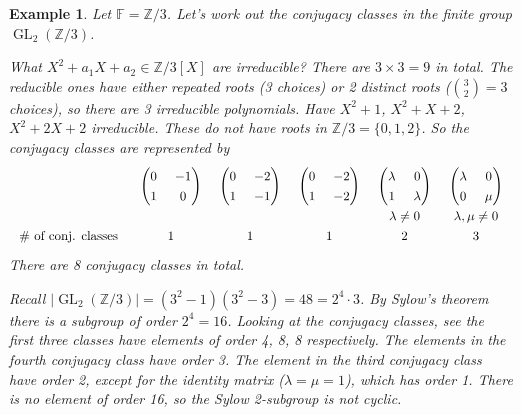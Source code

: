 \documentclass{article}
\theoremstyle{plain}\theoremheaderfont{\normalfont\itshape}\theorembodyfont{\rmfamily}\theoremseparator{.}\newtheorem*{rem}{Remark}\newtheorem*{ex}{Example}\newtheorem*{proof}{Proof}\newtheorem*{altp}{Alternative proof}\newtheorem*{nonex}{Non-Example}
\theoremstyle{plain}\theoremheaderfont{\normalfont\bfseries}\theorembodyfont{\rmfamily}\theoremseparator{.}\newtheorem{thm}{Theorem}[section]\newtheorem{lem}[thm]{Lemma}\newtheorem{prop}[thm]{Proposition}\newtheorem*{cor}{Corollary}\newtheorem{defn}[thm]{Definition}\newtheorem{clm}[thm]{Claim}\newtheorem{clminproof}{Claim}\newtheorem*{notn}{Notation}\newtheorem*{exer}{Exercise}\newtheorem*{lemnn}{Lemma}
\theoremstyle{break}\theoremheaderfont{\normalfont\itshape}\theorembodyfont{\rmfamily}\theoremseparator{.\medskip}\newtheorem*{proofskip}{Proof}\newtheorem*{exs}{Examples}\newtheorem*{rems}{Remarks}\newtheorem*{obs}{Observations}
\theoremstyle{break}\theoremheaderfont{\normalfont\bfseries}\theorembodyfont{\rmfamily}\theoremseparator{.\medskip}\newtheorem{lemskip}[thm]{Lemma}\newtheorem{defnskip}[thm]{Definition}\newtheorem{propskip}[thm]{Proposition}\newtheorem{thmskip}[thm]{Theorem}
\numberwithin{equation}{section}
\newcommand{\abs}[1]{\left|#1\right|}
\DeclareMathOperator{\GL}{GL}
\newcommand{\ZZ}{\mathbb{Z}}
\newcommand{\FF}{\mathbb{F}}
\begin{document}
    \begin{ex}
        Let \(\FF=\ZZ/3\). Let's work out the conjugacy classes in the finite group \(\GL_2(\ZZ/3)\).

        What \(X^2+a_1X+a_2\in\ZZ/3[X]\) are irreducible? There are \(3\times 3=9\) in total. The reducible ones have either repeated roots (3 choices) or 2 distinct roots (\(\binom{3}{2}=3\) choices), so there are 3 irreducible polynomials. Have \(X^2+1\), \(X^2+X+2\), \(X^2+2X+2\) irreducible. These do not have roots in \(\ZZ/3=\{0,1,2\}\). So the conjugacy classes are represented by
        \[\def\arraystretch{1.3}\arraycolsep=7pt
        \begin{array}{cccccc}
             ~ & \begin{pmatrix}
                0 & -1 \\ 1 & 0
            \end{pmatrix} & \begin{pmatrix}
                0 & -2 \\ 1 & -1
            \end{pmatrix} & \begin{pmatrix}
                0 & -2 \\ 1 & -2
            \end{pmatrix} & \begin{pmatrix}
                \lambda & 0 \\ 1 & \lambda
            \end{pmatrix} & \begin{pmatrix}
                \lambda & 0 \\ 0 & \mu
            \end{pmatrix} \\
            ~ & ~ & ~ & ~ & \lambda\ne 0 & \lambda,\mu\ne 0 \\
            \#\text{ of conj. classes } & 1 & 1 & 1 & 2 & 3
        \end{array}\]
        There are 8 conjugacy classes in total.

        Recall \(\abs{\GL_2(\ZZ/3)}=(3^2-1)(3^2-3)=48=2^4\cdot 3\). By Sylow's theorem there is a subgroup of order \(2^4=16\).  Looking at the conjugacy classes, see the first three classes have elements of order 4, 8, 8 respectively. The elements in the fourth conjugacy class have order 3. The element in the third conjugacy class have order 2, except for the identity matrix (\(\lambda=\mu=1\)), which has order 1. There is no element of order 16, so the Sylow 2-subgroup is not cyclic.


\end{ex}
\end{document}
